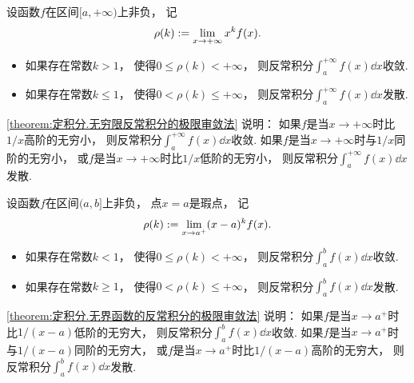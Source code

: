 \begin{theorem}[极限审敛法1]\label{theorem:定积分.无穷限反常积分的极限审敛法}
设函数\(f\)在区间\([a,+\infty)\)上非负，
记\begin{equation*}
	\rho(k) := \lim_{x\to+\infty} x^k f(x).
\end{equation*}
\begin{itemize}
	\item 如果存在常数\(k > 1\)，
	使得\(0 \leq \rho(k) < +\infty\)，
	则反常积分\(\int_a^{+\infty} f(x) \dd{x}\)收敛.
	\item 如果存在常数\(k \leq 1\)，
	使得\(0 < \rho(k) \leq +\infty\)，
	则反常积分\(\int_a^{+\infty} f(x) \dd{x}\)发散.
\end{itemize}
\end{theorem}
\begin{remark}
\cref{theorem:定积分.无穷限反常积分的极限审敛法} 说明：
如果\(f\)是当\(x\to+\infty\)时比\(1/x\)高阶的无穷小，
则反常积分\(\int_a^{+\infty} f(x) \dd{x}\)收敛.
如果\(f\)是当\(x\to+\infty\)时与\(1/x\)同阶的无穷小，
或\(f\)是当\(x\to+\infty\)时比\(1/x\)低阶的无穷小，
则反常积分\(\int_a^{+\infty} f(x) \dd{x}\)发散.
\end{remark}

\begin{theorem}[极限审敛法2]\label{theorem:定积分.无界函数的反常积分的极限审敛法}
设函数\(f\)在区间\((a,b]\)上非负，
点\(x=a\)是瑕点，
记\begin{equation*}
	\rho(k) := \lim_{x\to a^+} (x-a)^k f(x).
\end{equation*}
\begin{itemize}
	\item 如果存在常数\(k < 1\)，
	使得\(0 \leq \rho(k) < +\infty\)，
	则反常积分\(\int_a^b f(x) \dd{x}\)收敛.

	\item 如果存在常数\(k \geq 1\)，
	使得\(0 < \rho(k) \leq +\infty\)，
	则反常积分\(\int_a^b f(x) \dd{x}\)发散.
\end{itemize}
\end{theorem}
\begin{remark}
\cref{theorem:定积分.无界函数的反常积分的极限审敛法} 说明：
如果\(f\)是当\(x \to a^+\)时比\(1/(x-a)\)低阶的无穷大，
则反常积分\(\int_a^b f(x) \dd{x}\)收敛.
如果\(f\)是当\(x \to a^+\)时与\(1/(x-a)\)同阶的无穷大，
或\(f\)是当\(x \to a^+\)时比\(1/(x-a)\)高阶的无穷大，
则反常积分\(\int_a^b f(x) \dd{x}\)发散.
\end{remark}

